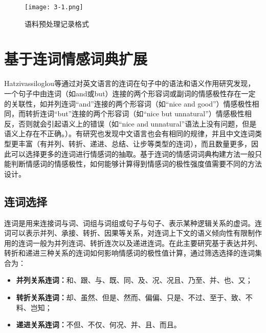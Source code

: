 \begin{figure}[htp]
\centering
\texttt{[image: 3-1.png]}
\caption{语料预处理记录格式}
\label{fig3-1}
\end{figure}

\section{基于连词情感词典扩展}
Hatzivassiloglou等通过对英文语言的连词在句子中的语法和语义作用研究发现，一个句子中由连词（如and或but）连接的两个形容词或副词的情感极性存在一定的关联性，如并列连词“and”连接的两个形容词（如“nice and good”）情感极性相同，而转折连词“but”连接的两个形容词（如“nice but unnatural”）情感极性相反，否则就会引起语义上的错误（如“nice and unnatural”语法上没有问题，但是语义上存在不正确。）。有研究也发现中文语言也会有相同的规律，并且中文连词类型更丰富（有并列、转折、递进、总结、让步等类型的连词），而且数量更多，因此可以选择更多的连词进行情感词的抽取。基于连词的情感词词典构建方法一般只能判断情感词的情感极性，如何能够计算得到情感词的极性强度值需要不同的方法设计。

\subsection{连词选择}
连词是用来连接词与词、词组与词组或句子与句子、表示某种逻辑关系的虚词。连词可以表示并列、承接、转折、因果等关系，对连词上下文的语义倾向性有限制作用的连词一般为并列连词、转折连次以及递进连词。在此主要研究基于表达并列、转折和递进三种关系的连词如何影响情感词的极性值计算，通过筛选选择的连词集合为：
\begin{itemize}
\item \textbf{并列关系连词：}和、跟、与、既、同、及、况、况且、乃至、并、也、又；
\item \textbf{转折关系连词：}却、虽然、但是、然而、偏偏、只是、不过、至于、致、不料、岂知；
\item \textbf{递进关系连词：}不但、不仅、何况、并、且、而且。
\end{itemize}

